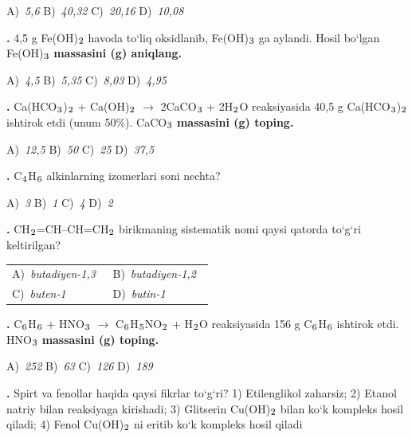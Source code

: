 \documentclass[11pt,a4paper]{article}
\renewcommand{\textsubscript}[1]{\ensuremath{_{\text{\fontsize{8}{8}\selectfont #1}}}}
\newcommand{\qn}[1]{\textbf{\fontsize{11.5}{13}\selectfont #1}}
\newcommand{\qsep}{\par\vspace{1pt}\noindent\rule{0pt}{0.4pt}\par\vspace{5pt}}
\begin{document}
\begin{multicols}{2}
\noindent A)~\textsl{5,6} \hfill B)~\textsl{40,32} \hfill C)~\textsl{20,16} \hfill D)~\textsl{10,08}\par
\qsep
\noindent\qn{18.} 4,5 g Fe(OH)\textsubscript{2} havoda to`liq oksidlanib, Fe(OH)\textsubscript{3} ga aylandi. Hosil bo`lgan Fe(OH)\textsubscript{3} \textbf{massasini (g) aniqlang.}

\noindent A)~\textsl{4,5} \hfill B)~\textsl{5,35} \hfill C)~\textsl{8,03} \hfill D)~\textsl{4,95}\par
\qsep
\noindent\qn{19.} Ca(HCO\textsubscript{3})\textsubscript{2} + Ca(OH)\textsubscript{2} $\to$ 2CaCO\textsubscript{3} + 2H\textsubscript{2}O reaksiyasida 40,5 g Ca(HCO\textsubscript{3})\textsubscript{2} ishtirok etdi (unum 50\%). CaCO\textsubscript{3} \textbf{massasini (g) toping.}

\noindent A)~\textsl{12,5} \hfill B)~\textsl{50} \hfill C)~\textsl{25} \hfill D)~\textsl{37,5}\par
\qsep
\noindent\qn{20.} C\textsubscript{4}H\textsubscript{6} alkinlarning izomerlari soni nechta?

\noindent A)~\textsl{3} \hfill B)~\textsl{1} \hfill C)~\textsl{4} \hfill D)~\textsl{2}\par
\qsep
\noindent\qn{21.} CH\textsubscript{2}=CH--CH=CH\textsubscript{2} birikmaning sistematik nomi qaysi qatorda to`g`ri keltirilgan?

\noindent\begin{tabular}{@{}p{0.47\linewidth}@{}p{0.47\linewidth}@{}}
A)~\textsl{butadiyen-1,3} & B)~\textsl{butadiyen-1,2} \\
C)~\textsl{buten-1} & D)~\textsl{butin-1} \\
\end{tabular}\par
\qsep
\noindent\qn{22.} C\textsubscript{6}H\textsubscript{6} + HNO\textsubscript{3} $\to$ C\textsubscript{6}H\textsubscript{5}NO\textsubscript{2} + H\textsubscript{2}O reaksiyasida 156 g C\textsubscript{6}H\textsubscript{6} ishtirok etdi. HNO\textsubscript{3} \textbf{massasini (g) toping.}

\noindent A)~\textsl{252} \hfill B)~\textsl{63} \hfill C)~\textsl{126} \hfill D)~\textsl{189}\par
\qsep
\noindent\qn{23.} Spirt va fenollar haqida qaysi fikrlar to`g`ri? 1) Etilenglikol zaharsiz; 2) Etanol natriy bilan reaksiyaga kirishadi; 3) Glitserin Cu(OH)\textsubscript{2} bilan ko`k kompleks hosil qiladi; 4) Fenol Cu(OH)\textsubscript{2} ni eritib ko`k kompleks hosil qiladi


\end{multicols}
\end{document}
